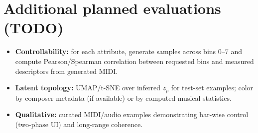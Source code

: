 \section{Additional planned evaluations (TODO)}
\begin{itemize}[leftmargin=*,itemsep=0pt]
  \item \textbf{Controllability:} for each attribute, generate samples across bins 0--7 and compute Pearson/Spearman correlation between requested bins and measured descriptors from generated MIDI.
  \item \textbf{Latent topology:} UMAP/t-SNE over inferred $z_p$ for test-set examples; color by composer metadata (if available) or by computed musical statistics.
  \item \textbf{Qualitative:} curated MIDI/audio examples demonstrating bar-wise control (two-phase UI) and long-range coherence.
\end{itemize}

